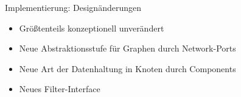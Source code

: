 \begin{frame}{Implementierung: Designänderungen}
    \begin{itemize}
      \item Größtenteils konzeptionell unverändert
      \pause
      \item Neue Abstraktionsstufe für Graphen durch Network-Ports
      \pause
      \item Neue Art der Datenhaltung in Knoten durch Components
      \pause
      \item Neues Filter-Interface
    \end{itemize}
\end{frame} 